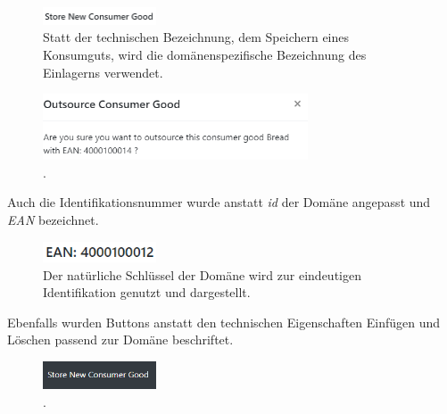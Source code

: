 \begin{figure}[H]
	\centering
	\includegraphics[width=0.3\textwidth]{Bilder/gui/Ubiquitous Language/store-text.PNG}
	\caption[Überschrift Eingabemaske zum Einlagern eines Konsumguts.]{Statt der technischen Bezeichnung, dem Speichern eines Konsumguts, wird die domänenspezifische Bezeichnung des Einlagerns verwendet.}
	\label{fig:gui-titel-einlagern}
\end{figure}

\begin{figure}[H]
	\centering
	\includegraphics[width=0.7\textwidth]{Bilder/gui/Ubiquitous Language/outsource-text.PNG}
	\caption[Bezeichnung eines Auslagerungsvorgangs.]{.}
	\label{fig:gui-titel-auslagern}
\end{figure}

Auch die Identifikationsnummer wurde anstatt \textit{id} der Domäne angepasst und \textit{EAN} bezeichnet. 

\begin{figure}[H]
	\centering
	\includegraphics[width=0.3\textwidth]{Bilder/gui/Ubiquitous Language/ean.PNG}
	\caption[Darstellung EAN-Code.]{Der natürliche Schlüssel der Domäne wird zur eindeutigen Identifikation genutzt und dargestellt.}
	\label{fig:gui-darstellung-ean}
\end{figure}

Ebenfalls wurden Buttons anstatt den technischen Eigenschaften Einfügen und Löschen passend zur Domäne beschriftet.

\begin{figure}[H]
	\centering
	\includegraphics[width=0.3\textwidth]{Bilder/gui/Ubiquitous Language/Store new consumer good.PNG}
	\caption[Button zum Öffnen der Eingabemaske zum Einlagern eines Konsumguts.]{.}
	\label{fig:gui-button-eingabemaske-einlagern}
\end{figure}

